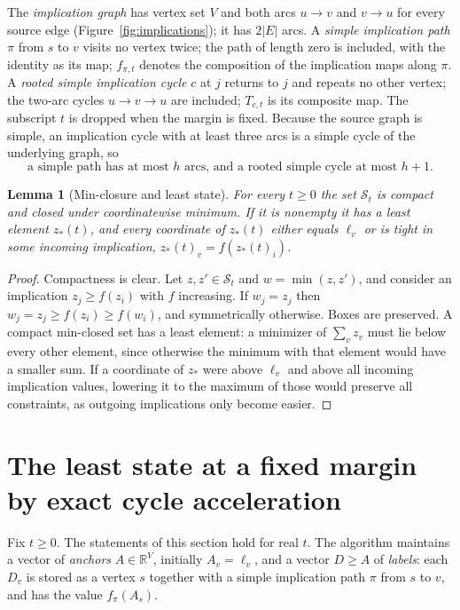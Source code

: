 \documentclass[11pt,a4paper]{article}
\theoremstyle{plain}
\newtheorem{lemma}[theorem]{Lemma}
\theoremstyle{definition}
\theoremstyle{remark}
\newcommand{\R}{\mathbb{R}}
\newcommand{\St}{\mathcal{S}_t}
\begin{document}
The \emph{implication graph} has vertex set $V$ and both arcs $u\to v$ and $v\to u$ for every source edge (Figure~\ref{fig:implications}); it has $2|E|$ arcs. A \emph{simple implication path} $\pi$ from $s$ to $v$ visits no vertex twice; the path of length zero is included, with the identity as its map; $f_{\pi,t}$ denotes the composition of the implication maps along $\pi$. A \emph{rooted simple implication cycle} $c$ at $j$ returns to $j$ and repeats no other vertex; the two-arc cycles $u\to v\to u$ are included; $T_{c,t}$ is its composite map. The subscript $t$ is dropped when the margin is fixed. Because the source graph is simple, an implication cycle with at least three arcs is a simple cycle of the underlying graph, so
\begin{equation}\label{eq:lengths}
  \text{a simple path has at most } h \text{ arcs, and a rooted simple cycle at most } h+1 .
\end{equation}

\begin{lemma}[Min-closure and least state]\label{lem:least}
For every $t\ge0$ the set $\St$ is compact and closed under coordinatewise minimum. If it is nonempty it has a least element $z_*(t)$, and every coordinate of $z_*(t)$ either equals $\ell_v$ or is tight in some incoming implication, $z_*(t)_v=f(z_*(t)_i)$.
\end{lemma}
\begin{proof}
Compactness is clear. Let $z,z'\in\St$ and $w=\min(z,z')$, and consider an implication $z_j\ge f(z_i)$ with $f$ increasing. If $w_j=z_j$ then $w_j=z_j\ge f(z_i)\ge f(w_i)$, and symmetrically otherwise. Boxes are preserved. A compact min-closed set has a least element: a minimizer of $\sum_v z_v$ must lie below every other element, since otherwise the minimum with that element would have a smaller sum. If a coordinate of $z_*$ were above $\ell_v$ and above all incoming implication values, lowering it to the maximum of those would preserve all constraints, as outgoing implications only become easier.
\end{proof}

\section{The least state at a fixed margin by exact cycle acceleration}\label{sec:acceleration}

Fix $t\ge0$. The statements of this section hold for real $t$. The algorithm maintains a vector of \emph{anchors} $A\in\R^V$, initially $A_v=\ell_v$, and a vector $D\ge A$ of \emph{labels}: each $D_v$ is stored as a vertex $s$ together with a simple implication path $\pi$ from $s$ to $v$, and has the value $f_\pi(A_s)$.
\end{document}
